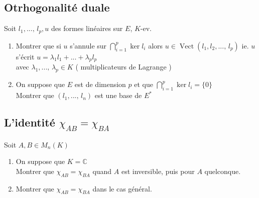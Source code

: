 \documentclass[10pt,a4paper]{article}
\theoremstyle{definition}
\DeclareMathOperator{\Vect}{Vect}
\begin{document}
\subsection{Otrhogonalité duale}
Soit $l_1, ...,\, l_p, u$ des formes linéaires sur $E$, $K$-ev.
\begin{enumerate}
\item Montrer que si $u$ s'annule sur $\bigcap\limits_{i = 1}^p \ker l_i$ alors $u \in \Vect(l_1, l_2, ...,\, l_p)$ ie. $u$ s'écrit $u = \lambda_1 l_1 + ... + \lambda_p l_p$ \\ 
avec $\lambda_1, ...,\, \lambda_p \in K$ ( multiplicateurs de Lagrange )
\item On suppose que $E$ est de dimension $p$ et que $\bigcap\limits_{i = 1}^p \ker l_i = \{ 0 \}$ \\
Montrer que $(l_1, ...,\, l_n)$ est une base de $E^*$
\end{enumerate}

\subsection{L'identité $\chi_{AB} = \chi_{BA}$}
\noindent Soit $A, B \in M_n(K)$
\begin{enumerate}
\item On suppose que $K = \mathbb{C}$ \\
Montrer que $\chi_{AB} = \chi_{BA}$ quand $A$ est inversible, puis pour $A$ quelconque.
\item Montrer que $\chi_{AB} = \chi_{BA}$ dans le cas général.
\end{enumerate}
\end{document}
